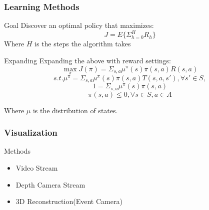 \begin{frame}
  \frametitle{Learning Methods}
  \begin{block}{Goal}
    Discover an optimal policy that maximizes:
    $$J=E\{\Sigma_{h=0}^HR_h\}$$
    Where $H$ is the steps the algorithm takes
  \end{block}

  \begin{exampleblock}{Expanding}
    Expanding the above with reward settings:
    $$\max_{\pi}J(\pi) = \Sigma_{s,a}\mu^{\pi}(s)\pi(s, a)R(s, a)$$
    $$s.t. \mu^{\pi} = \Sigma_{s,a}\mu^{\pi}(s)\pi(s, a)T(s,a,s'),
    \forall s'\in S,$$
    $$1 = \Sigma_{s,a}\mu^{\pi}(s)\pi(s, a)$$
    $$\pi(s, a)\le 0, \forall s\in S, a\in A$$
    
    Where $\mu$ is the distribution of states.
  \end{exampleblock}
\end{frame}

\begin{frame}
  \frametitle{Visualization}
  \begin{block}{Methods}
    \begin{itemize}
    \item Video Stream
    \item Depth Camera Stream
    \item 3D Reconstruction(Event Camera)
    \end{itemize}
  \end{block}
\end{frame}

